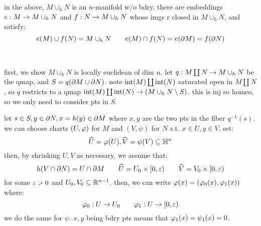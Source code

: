 \begin{prop}[type=Theorem]
    in the above, $M\cup_{h}N$ is an $n$-manifold w/o bdry. there are embeddings
    $e:M\rightarrow M\cup_{h}N$ and $f:N\rightarrow M\cup_{h}N$ whose imgs r closed in
    $M\cup_{h}N$, and satisfy:
    \begin{equation*}
        e(M) \cup f(N) = M\cup_{h}N \qquad
        e(M) \cap f(N) = e(\partial M) = f(\partial N)
    \end{equation*}
\end{prop} \

\begin{pf}[source=Primary Source Material]
    first, we show $M\cup_{h}N$ is locally euclidean of dim $n$.
    let $q:M\coprod N\rightarrow M\cup_{h}N$ be the qmap, and $S=q(\partial M\cup\partial N)$. note
    $\operatorname{int}(M)\coprod\operatorname{int}(N)$ saturated open in $M\coprod N$, so $q$ restricts to
    a qmap $\operatorname{int}(M)\coprod\operatorname{int}(N)\rightarrow(M\cup_{h}N\setminus S)$. this is inj so
    homeo, so we only need to consider pts in $S$.

    let $s \in S,y\in\partial N, x=h(y)\in\partial M$ where $x,y$ are the two pts in the
    fiber $q^{-1}(s)$. we can choose charts $(U,\varphi)$ for $M$ and $(V,\psi)$
    for $N$ s.t. $x\in U,y\in V$. set:
    \begin{equation*}
      \widehat{U}=\varphi(U),\widehat{V}=\psi(V)\subseteq \mathbb{H}^{n}  
    \end{equation*}
    then, by shrinking $U,V$ as necessary, we assume that:
    \begin{equation*}
      h(V\cap\partial N) = U\cap \partial M \qquad \widehat{U}=U_{0}\times[0,\varepsilon) \qquad
      \widehat{V}=V_{0}\times[0,\varepsilon)  
    \end{equation*}
    for some $\varepsilon > 0$ and $U_{0},V_{0} \subseteq \mathbb{R}^{n-1}$. then, we can write
    $\varphi(x)=(\varphi_{0}(x),\varphi_{1}(x))$ where:
    \begin{equation*}
        \varphi_{0}:U\rightarrow U_{0} \qquad \varphi_{1}:U\rightarrow[0,\varepsilon)
    \end{equation*}
    we do the same for $\psi$. $x,y$ being bdry pts means that
    $\varphi_{1}(x)=\psi_{1}(x)=0$.


\end{pf}
